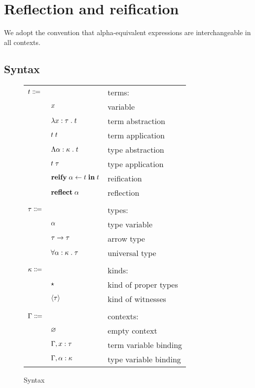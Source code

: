 \section{Reflection and reification}

  We adopt the convention that alpha-equivalent expressions are interchangeable in all contexts.

  \subsection{Syntax}

    \begin{figure}[H]
      \begin{center}
        \begin{tabular}{l l l}
          $t \Coloneqq$ & & terms: \\
          & $x$ & variable \\
          & $\lambda x : \tau \; . \; t$ & term abstraction \\
          & $t \; t$ & term application \\
          & $\Lambda \alpha : \kappa \; . \; t$ & type abstraction \\
          & $t \; \tau$ & type application \\
          & $\textbf{reify} \; \alpha \leftarrow t \; \textbf{in} \; t$ & reification \\
          & $\textbf{reflect} \; \alpha$ & reflection \\
          \\
          $\tau \Coloneqq$ & & types: \\
          & $\alpha$ & type variable \\
          & $\tau \rightarrow \tau$ & arrow type \\
          & $\forall \alpha : \kappa \; . \; \tau$ & universal type \\
          \\
          $\kappa \Coloneqq$ & & kinds: \\
          & $\star$ & kind of proper types \\
          & $\left\langle \tau \right\rangle$ & kind of witnesses \\
          \\
          $\Gamma \Coloneqq$ & & contexts: \\
          & $\varnothing$ & empty context \\
          & $\Gamma, x : \tau$ & term variable binding \\
          & $\Gamma, \alpha : \kappa$ & type variable binding \\
        \end{tabular}
      \end{center}

      \caption{Syntax}\label{fig:refl_syntax}
    \end{figure}

